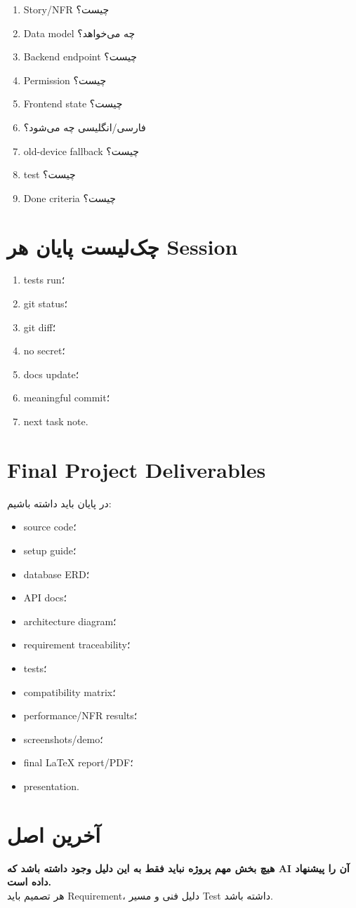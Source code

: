 \begin{enumerate}
  \item Story/NFR چیست؟
  \item Data model چه می‌خواهد؟
  \item Backend endpoint چیست؟
  \item Permission چیست؟
  \item Frontend state چیست؟
  \item فارسی/انگلیسی چه می‌شود؟
  \item old-device fallback چیست؟
  \item test چیست؟
  \item Done criteria چیست؟
\end{enumerate}

\section{چک‌لیست پایان هر Session}

\begin{enumerate}
  \item tests run؛
  \item git status؛
  \item git diff؛
  \item no secret؛
  \item docs update؛
  \item meaningful commit؛
  \item next task note.
\end{enumerate}

\section{Final Project Deliverables}

در پایان باید داشته باشیم:
\begin{itemize}
  \item source code؛
  \item setup guide؛
  \item database ERD؛
  \item API docs؛
  \item architecture diagram؛
  \item requirement traceability؛
  \item tests؛
  \item compatibility matrix؛
  \item performance/NFR results؛
  \item screenshots/demo؛
  \item final LaTeX report/PDF؛
  \item presentation.
\end{itemize}

\section{آخرین اصل}

\begin{center}
\Large
\textbf{هیچ بخش مهم پروژه نباید فقط به این دلیل وجود داشته باشد که AI آن را پیشنهاد داده است.}\\[0.6em]
\normalsize
هر تصمیم باید Requirement، دلیل فنی و مسیر Test داشته باشد.
\end{center}
